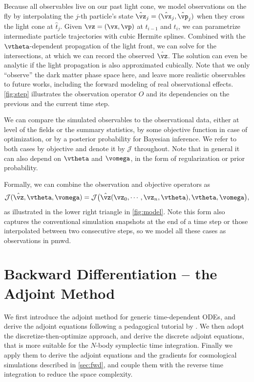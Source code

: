 \documentclass[modern, dvipsnames]{aastex631}
\newcommand{\pmwd}{{\usefont{T1}{nova}{m}{sl}pmwd}}
\newcommand{\cJ}{\mathcal{J}}
\begin{document}
Because all observables live on our past light cone, we model
observations on the fly by interpolating the $j$-th particle's state
$\hat\vz_j = (\hat\vx_j, \hat\vp_j)$ when they cross the light cone at
$\hat t_j$.
Given $\vz = (\vx, \vp)$ at $t_{i-1}$ and $t_i$, we can parametrize
intermediate particle trajectories with cubic Hermite splines.
Combined with the $\vtheta$-dependent propagation of the light front, we
can solve for the intersections, at which we can record the observed
$\hat\vz$.
The solution can even be analytic if the light propagation is also
approximated cubically.
Note that we only ``observe'' the dark matter phase space here, and
leave more realistic observables to future works, including the forward
modeling of real observational effects.
\autoref{fig:step} illustrates the observation operator $O$ and its
dependencies on the previous and the current time step.

We can compare the simulated observables to the observational data,
either at level of the fields or the summary statistics, by some
objective function in case of optimization, or by a posterior
probability for Bayesian inference.
We refer to both cases by objective and denote it by $\cJ$ throughout.
Note that in general it can also depend on $\vtheta$ and $\vomega$, in
the form of regularization or prior probability.

Formally, we can combine the observation and objective operators as
%
\begin{equation}
\cJ(\hat\vz, \vtheta, \vomega)
  = \cJ \bigl(
    \hat\vz(\vz_0, \cdots, \vz_n, \vtheta), \vtheta, \vomega
  \bigr),
\label{O}
\end{equation}
%
as illustrated in the lower right triangle in \autoref{fig:model}.
Note this form also captures the conventional simulation snapshots at
the end of a time step or those interpolated between two consecutive
steps, so we model all these cases as observations in \pmwd.


\vspace{1em}
\section{Backward Differentiation -- the Adjoint Method}
\label{sec:bwd}

We first introduce the adjoint method for generic time-dependent ODEs,
and derive the adjoint equations following a pedagogical tutorial by
\citet{Bradley2019}.
We then adopt the discretize-then-optimize approach, and derive the
discrete adjoint equations, that is more suitable for the $N$-body
symplectic time integration.
Finally we apply them to derive the adjoint equations and the gradients
for cosmological simulations described in \autoref{sec:fwd}, and couple
them with the reverse time integration to reduce the space complexity.
\end{document}
